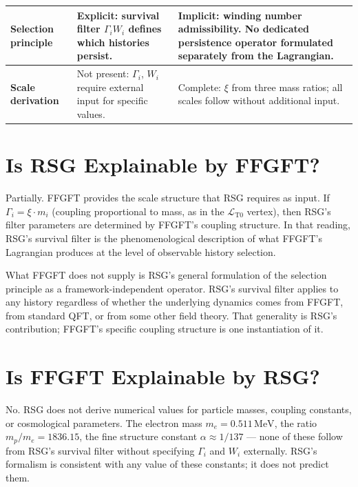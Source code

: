 {\begin{longtable}{p{3.5cm}p{5.0cm}p{5.0cm}}
\midrule

\textbf{Selection principle} &
Explicit: survival filter $\Gamma_i W_i$ defines which histories persist. &
Implicit: winding number admissibility. No dedicated persistence
operator formulated separately from the Lagrangian. \\

\midrule

\textbf{Scale derivation} &
Not present: $\Gamma_i$, $W_i$ require external input for specific values. &
Complete: $\xi$ from three mass ratios; all scales follow without
additional input. \\

\end{longtable}
}

\section{Is RSG Explainable by FFGFT?}

Partially. FFGFT provides the scale structure that RSG requires as input.
If $\Gamma_i = \xi \cdot m_i$ (coupling proportional to mass, as in the
$\mathcal{L}_{\text{T0}}$ vertex), then RSG's filter parameters are
determined by FFGFT's coupling structure. In that reading, RSG's survival
filter is the phenomenological description of what FFGFT's Lagrangian
produces at the level of observable history selection.

What FFGFT does not supply is RSG's general formulation of the selection
principle as a framework-independent operator. RSG's survival filter applies
to any history regardless of whether the underlying dynamics comes from FFGFT,
from standard QFT, or from some other field theory. That generality is
RSG's contribution; FFGFT's specific coupling structure is one instantiation
of it.

\section{Is FFGFT Explainable by RSG?}

No. RSG does not derive numerical values for particle masses, coupling
constants, or cosmological parameters. The electron mass $m_e = 0.511\,\text{MeV}$,
the ratio $m_p/m_e = 1836.15$, the fine structure constant $\alpha \approx
1/137$ — none of these follow from RSG's survival filter without specifying
$\Gamma_i$ and $W_i$ externally. RSG's formalism is consistent with any
value of these constants; it does not predict them.

